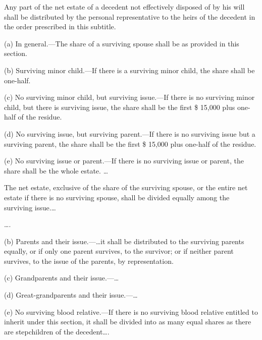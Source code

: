 


Any part of the net estate of a decedent not effectively disposed of by his will
shall be distributed by the personal representative to the heirs of the
decedent in the order prescribed in this subtitle.



(a) In general.---The share of a surviving spouse shall be as provided in this
section.

(b) Surviving minor child.---If there is a surviving minor child, the share
shall be one-half.

(c) No surviving minor child, but surviving issue.---If there is no surviving
minor child, but there is surviving issue, the share shall be the first \$
15,000 plus one-half of the residue.

(d) No surviving issue, but surviving parent.---If there is no surviving issue
but a surviving parent, the share shall be the first \$ 15,000 plus one-half of
the residue.

(e) No surviving issue or parent.---If there is no surviving issue or parent,
the share shall be the whole estate. \dots



The net estate, exclusive of the share of the surviving spouse, or the entire
net estate if there is no surviving spouse, shall be divided equally among the
surviving issue.\ldots



\ldots.

(b) Parents and their issue.---\ldots it shall be distributed to the
surviving parents equally, or if only one parent survives, to the survivor; or
if neither parent survives, to the issue of the parents, by representation.

(c) Grandparents and their issue.---\ldots

(d) Great-grandparents and their issue.---\ldots

(e) No surviving blood relative.---If there is no surviving blood relative
entitled to inherit under this section, it shall be divided into as many equal
shares as there are stepchildren of the decedent\ldots.

